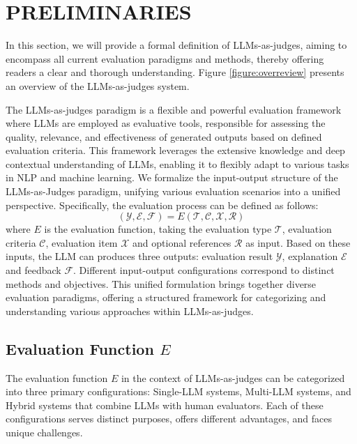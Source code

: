 \section{PRELIMINARIES}
\label{sec:PRELIMINARIES}
In this section, we will provide a formal definition of LLMs-as-judges, aiming to encompass all current evaluation paradigms and methods, thereby offering readers a clear and thorough understanding. Figure \ref{figure:overreview} presents an overview of the LLMs-as-judges system.




The LLMs-as-judges paradigm is a flexible and powerful evaluation framework where LLMs are employed as evaluative tools, responsible for assessing the quality, relevance, and effectiveness of generated outputs based on defined evaluation criteria. This framework leverages the extensive knowledge and deep contextual understanding of LLMs, enabling it to flexibly adapt to various tasks in NLP and machine learning.
We formalize the input-output structure of the LLMs-as-Judges paradigm, unifying various evaluation scenarios into a unified perspective. 
Specifically, the evaluation process can be defined as follows:
\begin{equation}\label{eqn-1} 
(\mathcal{Y}, \mathcal{E}, \mathcal{F})=E(\mathcal{T}, \mathcal{C}, \mathcal{X}, \mathcal{R})
\end{equation} 
where $E$ is the evaluation function, taking the evaluation type $\mathcal{T}$, evaluation criteria $\mathcal{C}$, evaluation item $\mathcal{X}$ and optional references $\mathcal{R}$ as input. Based on these inputs, the LLM can produces three outputs: evaluation result $\mathcal{Y}$, explanation $\mathcal{E}$ and feedback $\mathcal{F}$.
Different input-output configurations correspond to distinct methods and objectives. This unified formulation brings together diverse evaluation paradigms, offering a structured framework for categorizing and understanding various approaches within LLMs-as-judges.


\subsection{Evaluation Function $E$}
The evaluation function $E$ in the context of LLMs-as-judges can be categorized into three primary configurations: Single-LLM systems, Multi-LLM systems, and Hybrid systems that combine LLMs with human evaluators. Each of these configurations serves distinct purposes, offers different advantages, and faces unique challenges.


